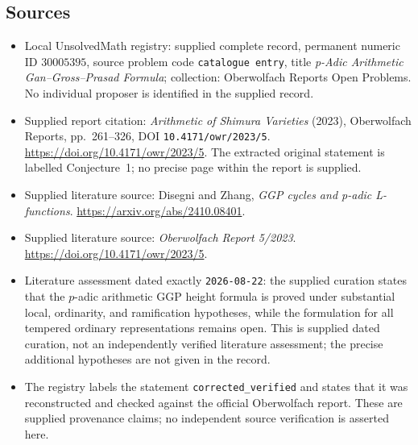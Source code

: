 \documentclass[11pt]{article}
\begin{document}
\subsection{Sources}
\begin{itemize}
\item Local UnsolvedMath registry: supplied complete record, permanent numeric ID \(30005395\), source problem code \texttt{catalogue entry}, title \emph{p-Adic Arithmetic Gan--Gross--Prasad Formula}; collection: Oberwolfach Reports Open Problems. No individual proposer is identified in the supplied record.
\item Supplied report citation: \emph{Arithmetic of Shimura Varieties} (2023), Oberwolfach Reports, pp.~261--326, DOI \texttt{10.4171/owr/2023/5}. \url{https://doi.org/10.4171/owr/2023/5}. The extracted original statement is labelled Conjecture~1; no precise page within the report is supplied.
\item Supplied literature source: Disegni and Zhang, \emph{GGP cycles and p-adic L-functions}. \url{https://arxiv.org/abs/2410.08401}.
\item Supplied literature source: \emph{Oberwolfach Report 5/2023}. \url{https://doi.org/10.4171/owr/2023/5}.
\item Literature assessment dated exactly \texttt{2026-08-22}: the supplied curation states that the \(p\)-adic arithmetic GGP height formula is proved under substantial local, ordinarity, and ramification hypotheses, while the formulation for all tempered ordinary representations remains open. This is supplied dated curation, not an independently verified literature assessment; the precise additional hypotheses are not given in the record.
\item The registry labels the statement \texttt{corrected\_verified} and states that it was reconstructed and checked against the official Oberwolfach report. These are supplied provenance claims; no independent source verification is asserted here.
\end{itemize}
\end{document}
